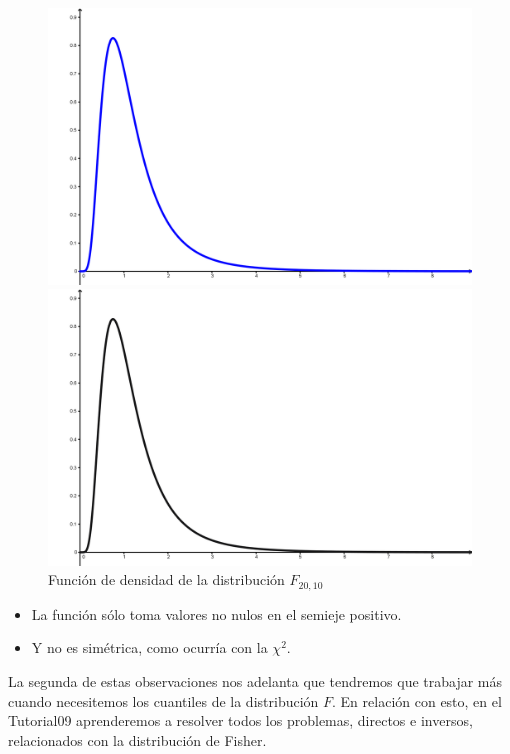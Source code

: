 \begin{figure}[ht]
\begin{center}
\begin{enColor}
\includegraphics[width=12cm]{../fig/Cap09-DistribucionF.png}
\end{enColor}
\begin{bn}
\includegraphics[width=12cm]{../fig/Cap09-DistribucionF-bn.png}
\end{bn}
\caption{Función de densidad de la distribución $F_{20,10}$}
\label{cap09:fig:DistribucionF}
\end{center}
\end{figure}

\begin{itemize}
  \item La función sólo toma valores no nulos en el semieje positivo.
  \item Y no es simétrica, como ocurría con la $\chi^2$.
\end{itemize}
La segunda de estas observaciones nos adelanta que tendremos que trabajar más cuando necesitemos los cuantiles de la distribución $F$. En relación con esto, en el Tutorial09 aprenderemos a resolver todos los problemas, directos e inversos, relacionados con la distribución de Fisher.

